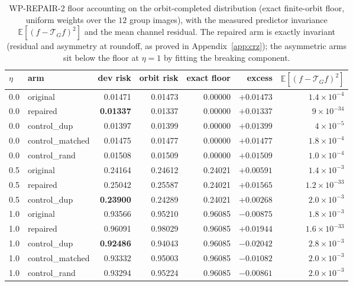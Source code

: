 \documentclass{neurips_2024}
\newcommand{\Tg}{\mathcal{T}_G}
\begin{document}
\begin{table}[t]
\centering
\caption{WP-REPAIR-2 floor accounting on the orbit-completed distribution (exact finite-orbit
floor, uniform weights over the $12$ group images), with the measured predictor invariance
$\mathbb{E}[(f-\Tg f)^2]$ and the mean channel residual. The repaired arm is exactly
invariant (residual and asymmetry at roundoff, as proved in Appendix~\ref{app:crz}); the
asymmetric arms sit below the floor at $\eta{=}1$ by fitting the breaking component.}
\label{tab:rep2floors}
\small
\begin{tabular}{@{}llrrrrr@{}}
\toprule
$\eta$ & arm & dev risk & orbit risk & exact floor & excess & $\mathbb{E}[(f-\Tg f)^2]$ \\
\midrule
0.0 & original & 0.01471 & 0.01473 & 0.00000 & $+0.01473$ & $1.4\times10^{-4}$ \\
0.0 & repaired & \textbf{0.01337} & 0.01337 & 0.00000 & $+0.01337$ & $9\times10^{-34}$ \\
0.0 & control\_dup & 0.01397 & 0.01399 & 0.00000 & $+0.01399$ & $4\times10^{-5}$ \\
0.0 & control\_matched & 0.01475 & 0.01477 & 0.00000 & $+0.01477$ & $1.8\times10^{-4}$ \\
0.0 & control\_rand & 0.01508 & 0.01509 & 0.00000 & $+0.01509$ & $1.0\times10^{-4}$ \\
\midrule
0.5 & original & 0.24164 & 0.24612 & 0.24021 & $+0.00591$ & $1.4\times10^{-3}$ \\
0.5 & repaired & 0.25042 & 0.25587 & 0.24021 & $+0.01565$ & $1.2\times10^{-33}$ \\
0.5 & control\_dup & \textbf{0.23900} & 0.24289 & 0.24021 & $+0.00268$ & $2.0\times10^{-3}$ \\
\midrule
1.0 & original & 0.93566 & 0.95210 & 0.96085 & $-0.00875$ & $1.8\times10^{-3}$ \\
1.0 & repaired & 0.96091 & 0.98029 & 0.96085 & $\mathbf{+0.01944}$ & $1.6\times10^{-33}$ \\
1.0 & control\_dup & \textbf{0.92486} & 0.94043 & 0.96085 & $-0.02042$ & $2.8\times10^{-3}$ \\
1.0 & control\_matched & 0.93332 & 0.95003 & 0.96085 & $-0.01082$ & $2.0\times10^{-3}$ \\
1.0 & control\_rand & 0.93294 & 0.95224 & 0.96085 & $-0.00861$ & $2.0\times10^{-3}$ \\
\bottomrule
\end{tabular}
\end{table}
\end{document}
